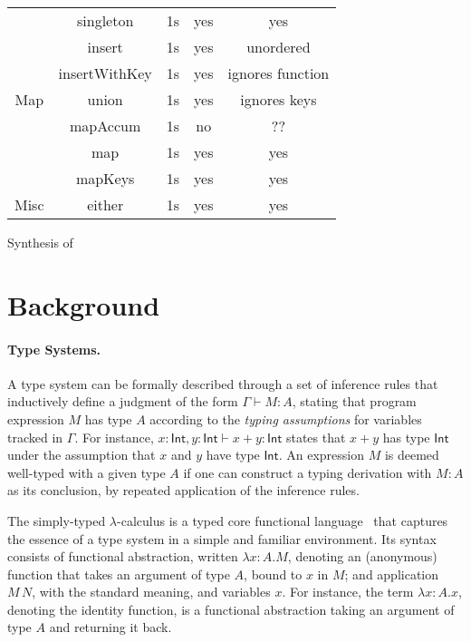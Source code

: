 \documentclass{llncs}
\newcommand{\mypara}[1]{\paragraph{\textbf{#1}.}}
\begin{document}
\begin{center}
\begin{tabular}{ |c|c|c|c|c| }
        \multirow{7}{4em}{Map} & singleton & 1s & yes & yes \\ 
        & insert & 1s & yes & unordered \\
        & insertWithKey & 1s & yes & ignores function \\
        & union & 1s & yes & ignores keys \\
        & mapAccum & 1s & no & ?? \\
        & map & 1s & yes & yes \\
        & mapKeys & 1s & yes & yes \\
        \hline
        \multirow{1}{4em}{Misc} & either & 1s & yes & yes \\ 
        \hline
    \end{tabular}
\end{center}


Synthesis of 









\appendix

\section{Background}\label{sec:background}

\mypara{Type Systems} A type system can be formally described through
a set of inference rules that inductively define a judgment of the
form $\Gamma \vdash M : A$, stating that program expression $M$ has
type $A$ according to the \emph{typing assumptions} for variables
tracked in $\Gamma$. For instance,
$x{:}\mathsf{Int}, y{:}\mathsf{Int} \vdash x+y : \mathsf{Int}$ states
that $x+y$ has type $\mathsf{Int}$ under the assumption that $x$ and
$y$ have type $\mathsf{Int}$.  An expression $M$ is deemed well-typed
with a given type $A$ if one can construct a typing derivation with $M :
A$ as its conclusion, by repeated application of the inference rules.

The simply-typed $\lambda$-calculus is a typed core functional
language~\cite{10.5555/509043} that captures the essence of a type system in a simple and familiar environment. Its syntax consists of
functional abstraction, written $\lambda x{:}A.M$, denoting
an (anonymous) function that takes an argument of type $A$, bound to
$x$ in $M$; and application $M\,N$, with the standard meaning, and
variables $x$. For instance, the term $\lambda x{:}A.x$, denoting the identity function, is a functional abstraction
taking an argument of type $A$ and returning it back.
\end{document}
